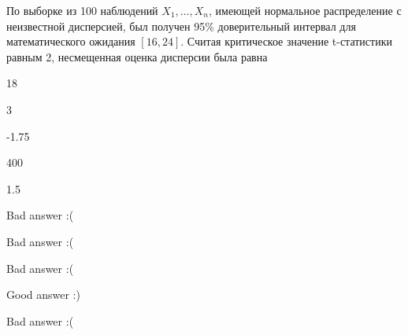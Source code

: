 
\begin{question}
По выборке из 100 наблюдений \(X_1,\ldots,X_{n}\), имеющей нормальное
распределение с неизвестной дисперсией, был получен 95\% доверительный
интервал для математического ожидания \([16,24]\). Считая критическое
значение t-статистики равным 2, несмещенная оценка дисперсии была равна
\begin{answerlist}
  \item 18
  \item 3
  \item -1.75
  \item 400
  \item 1.5
\end{answerlist}
\end{question}

\begin{solution}
\begin{answerlist}
  \item Bad answer :(
  \item Bad answer :(
  \item Bad answer :(
  \item Good answer :)
  \item Bad answer :(
\end{answerlist}
\end{solution}

